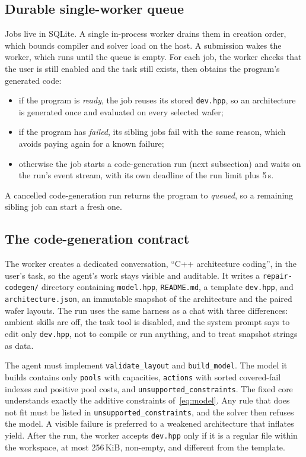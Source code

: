 \documentclass[conference]{IEEEtran}
\newcommand{\code}[1]{\texttt{\small #1}}
\begin{document}
\subsection{Durable single-worker queue}
Jobs live in SQLite. A single in-process worker drains them in creation
order, which bounds compiler and solver load on the host. A submission wakes
the worker, which runs until the queue is empty. For each job, the
worker checks that the user is still enabled and the task still exists, then
obtains the program's generated code:
\begin{itemize}
\item if the program is \emph{ready}, the job reuses its stored
\code{dev.hpp}, so an architecture is generated once and evaluated on every
selected wafer;
\item if the program has \emph{failed}, its sibling jobs fail with the same
reason, which avoids paying again for a known failure;
\item otherwise the job starts a code-generation run (next subsection) and
waits on the run's event stream, with its own deadline of the run limit plus
5\,s.
\end{itemize}
A cancelled code-generation run returns the program to \emph{queued}, so a
remaining sibling job can start a fresh one.

\subsection{The code-generation contract}
\label{sec:contract}
The worker creates a dedicated conversation, ``C++ architecture coding'', in
the user's task, so the agent's work stays visible and auditable. It writes a
\code{repair-codegen/} directory containing \code{model.hpp},
\code{README.md}, a template \code{dev.hpp}, and \code{architecture.json}, an
immutable snapshot of the architecture and the paired wafer layouts. The run
uses the same harness as a chat with three differences: ambient skills are
off, the task tool is disabled, and the system prompt says to edit only
\code{dev.hpp}, not to compile or run anything, and to treat snapshot strings
as data.

The agent must implement \code{validate\_layout} and \code{build\_model}.
The model it builds contains only \code{pools} with capacities,
\code{actions} with sorted covered-fail indexes and positive pool costs, and
\code{unsupported\_constraints}. The fixed core understands exactly the
additive constraints of~\eqref{eq:model}. Any rule that does not fit must be
listed in \code{unsupported\_constraints}, and the solver then refuses the
model. A visible failure is preferred to a weakened architecture that
inflates yield. After the run, the worker accepts \code{dev.hpp} only if it
is a regular file within the workspace, at most 256\,KiB, non-empty, and
different from the template.
\end{document}

